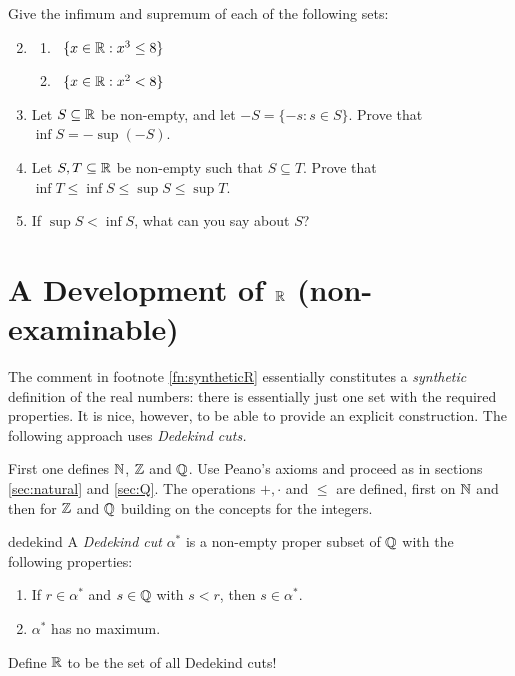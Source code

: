 \begin{exercisessec}{}{}
	\exstart %
	Give the infimum and supremum of each of the following sets:
	\begin{enumerate}\setcounter{enumi}{1}
  \item[]\begin{enumerate}
    \item {} \ $\{x\in\mathbb{R}:x^3\le 8\}$
    \setcounter{enumii}{2}
    \item {} \ $\{x\in\mathbb{R}:x^2<8\}$
  \end{enumerate}
  

  \item%
  Let $S\subseteq\mathbb{R}$ be non-empty, and let $-S=\{-s:s\in S\}$. Prove that $\inf S=-\sup(-S)$.


  \item%
  Let $S,T\subseteq\mathbb{R}$ be non-empty such that $S\subseteq T$. Prove that $\inf T\le \inf S\le \sup S\le\sup T$.
  
  \item If $\sup S<\inf S$, what can you say about $S$?
  
\end{enumerate}
\end{exercisessec}

\clearpage


\section[A Development of R]{A Development of $\mathbb{R}$ (non-examinable)}\label{sec:dedekind}


The comment in footnote \ref{fn:syntheticR} essentially constitutes a \emph{synthetic} definition of the real numbers: there is essentially just one set with the required properties. It is nice, however, to be able to provide an explicit construction. The following approach uses \emph{Dedekind cuts.}\medbreak

First one defines $\mathbb{N}$, $\mathbb{Z}$ and $\mathbb{Q}$. Use Peano's axioms and proceed as in sections \ref{sec:natural} and \ref{sec:Q}. The operations $+,\cdot$ and $\le$ are defined, first on $\mathbb{N}$ and then for $\mathbb{Z}$ and $\mathbb{Q}$ building on the concepts for the integers.

\begin{defn}{}{dedekind}
A \emph{Dedekind cut} $\alpha^*$ is a non-empty proper subset of $\mathbb{Q}$ with the following properties:
	\begin{enumerate}
  	\item If $r\in\alpha^*$ and $s\in\mathbb{Q}$ with $s<r$, then $s\in\alpha^*$.
  	\item $\alpha^*$ has no maximum.
	\end{enumerate}
	Define $\mathbb{R}$ to be the set of all Dedekind cuts!
\end{defn}

